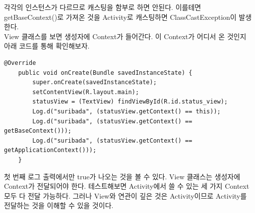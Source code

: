각각의 인스턴스가 다르므로 캐스팅을 함부로 하면 안된다. 이를테면 getBaseContext()로 가져온 것을 Activity로 캐스팅하면 ClassCastException이 발생한다.\\

View 클래스를 보면 생성자에 Context가 들어간다. 이 Context가 어디서 온 것인지 아래 코드를 통해 확인해보자.
\begin{lstlisting}[frame=single]
    @Override
    public void onCreate(Bundle savedInstanceState) {
        super.onCreate(savedInstanceState);
        setContentView(R.layout.main);
        statusView = (TextView) findViewById(R.id.status_view);
        Log.d("suribada", (statusView.getContext() == this));
        Log.d("suribada", (statusView.getContext() == getBaseContext()));
        Log.d("suribada", (statusView.getContext() == getApplicationContext()));
    }
\end{lstlisting}
첫 번째 로그 출력에서만 true가 나오는 것을 볼 수 있다. View 클래스는 생성자에 Context가 전달되어야 한다. 테스트해보면 Activity에서 쓸 수 있는 세 가지 Context 모두 다 전달 가능하다. 그러나 View와 연관이 깊은 것은 Activity이므로 Activity를 전달하는 것을 이해할 수 있을 것이다.
